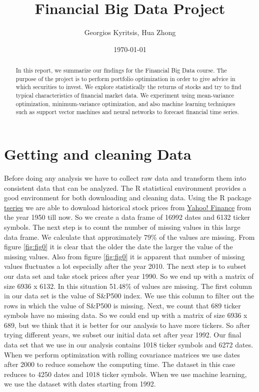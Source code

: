 \documentclass[letterpaper,12pt]{article}
\begin{document}
\title{Financial Big Data Project}
\author{Georgios Kyritsis, Hua Zhong}
\date{\today}
\maketitle

\begin{abstract}
In this report, we summarize our findings for the Financial Big Data course. The purpose of the project is to perform portfolio optimization in order to give advice in which securities to invest. We explore statistically the returns of stocks and try to find typical characteristics of financial market data. We experiment using mean-variance optimization, minimum-variance optimization, and also machine learning techniques such as support vector machines and neural networks to forecast financial time series.
\end{abstract}

\section{Getting and cleaning Data}
Before doing any analysis we have to collect raw data and transform them into consistent data that can be analyzed. The R statistical environment provides a good environment for both downloading and cleaning data. Using the R package \href{https://cran.r-project.org/web/packages/tseries/index.html}{tseries} we are able to download historical stock prices from \href{http://finance.yahoo.com}{Yahoo! Finance} from the year 1950 till now. So we create a data frame of 16992 dates and 6132 ticker symbols. The next step is to count the number of missing values in this large data frame. We calculate that approximately 79\% of the values are missing. From figure \ref{fig:fig0} it is clear that the older the date the larger the value of the missing values. Also from figure \ref{fig:fig0} it is apparent that number of missing values fluctuates a lot especially after the year 2010. The next step is to subset our data set and take stock prices after year 1990. So we end up with a matrix of size 6936 x 6132. In this situation 51.48\% of values are missing. The first column in our data set is the value of S\&P500 index. We use this column to filter out the rows in which the value of S\&P500 is missing. Next, we count that 689 ticker symbols have no missing data. So we could end up with a matrix of size 6936 x 689, but we think that it is better for our analysis to have more tickers. So after trying different years, we subset our initial data set after year 1992. Our final data set that we use in our analysis contains 1018 ticker symbols and 6272 dates. When we perform optimization with rolling covariance matrices we use dates after 2000 to reduce somehow the computing time. The dataset in this case reduces to 4250 dates and 1018 ticker symbols. When we use machine learning, we use the dataset with dates starting from 1992.
\end{document}

